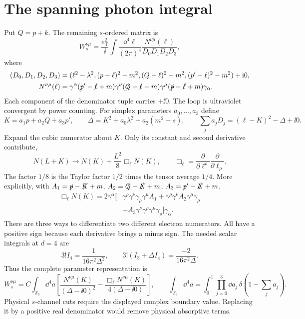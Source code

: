 \section{The spanning photon integral}
Put $Q=p+k$. The remaining $s$-ordered matrix is
\begin{equation}
 W_s^{\nu\mu}=\frac{e_{\mathrm T}^2}{\ii}
 \int\frac{\dd^4\ell}{(2\pi)^4}
 \frac{N^{\nu\mu}(\ell)}
 {D_0D_1D_2D_3},
\end{equation}
where
\begin{align}
 (D_0,D_1,D_2,D_3)&=(\ell^2-\lambda^2,
 (p-\ell)^2-m^2,(Q-\ell)^2-m^2,(p'-\ell)^2-m^2)+\mathrm{i}0,\\
 N^{\nu\mu}(\ell)&=\gamma^\alpha(\slashed p'-\slashed\ell+m)
 \gamma^\nu(\slashed Q-\slashed\ell+m)
 \gamma^\mu(\slashed p-\slashed\ell+m)\gamma_\alpha.
\end{align}
Each component of the denominator tuple carries $+\ii0$.
The loop is ultraviolet convergent by power counting. For simplex
parameters $a_0,\ldots,a_3$ define
\begin{equation}
 K=a_1p+a_2Q+a_3p',\qquad
 \Delta=K^2+a_0\lambda^2+a_2(m^2-s),\qquad
 \sum_j a_jD_j=(\ell-K)^2-\Delta+\ii0.
\end{equation}
Expand the cubic numerator about $K$. Only its constant and second
derivative contribute,
\begin{equation}
 N(L+K)\longrightarrow N(K)+\frac{L^2}{8}\Box_\ell N(K),
 \qquad \Box_\ell=\frac{\partial}{\partial\ell^\rho}
                       \frac{\partial}{\partial\ell_\rho}.
\end{equation}
The factor $1/8$ is the Taylor factor $1/2$ times the tensor
average $1/4$. More explicitly, with $A_1=\slashed p-\slashed K+m$,
$A_2=\slashed Q-\slashed K+m$, $A_3=\slashed p'-\slashed K+m$,
\begin{equation}
 \begin{aligned}
 \Box_\ell N(K)=2\gamma^\alpha\big[&
 \gamma^\rho\gamma^\nu\gamma_\rho\gamma^\mu A_1
 +\gamma^\rho\gamma^\nu A_2\gamma^\mu\gamma_\rho\\
 &+A_3\gamma^\nu\gamma^\rho\gamma^\mu\gamma_\rho
 \big]\gamma_\alpha.
 \end{aligned}
\end{equation}
There are three ways to differentiate two different electron
numerators. All have a positive sign because each derivative brings
a minus sign. The needed scalar integrals at $d=4$ are
\begin{equation}
 3! I_4=\frac1{16\pi^2\Delta^2},\qquad
 3!(I_3+\Delta I_4)=\frac{-2}{16\pi^2\Delta}.
\end{equation}
Thus the complete parameter representation is
\begin{equation}
 W_s^{\nu\mu}=C\int_{\mathcal S_3}\dd^4a
 \left[\frac{N^{\nu\mu}(K)}{(\Delta-\ii0)^2}
       -\frac{\Box_\ell N^{\nu\mu}(K)}{4(\Delta-\ii0)}\right],
 \qquad \int_{\mathcal S_3}\dd^4a=
 \int_0^1\prod_{j=0}^3\dd a_j\,\delta(1-\sum_j a_j).
\end{equation}
Physical $s$-channel cuts require the displayed complex boundary
value. Replacing it by a positive real denominator would remove
physical absorptive terms.

